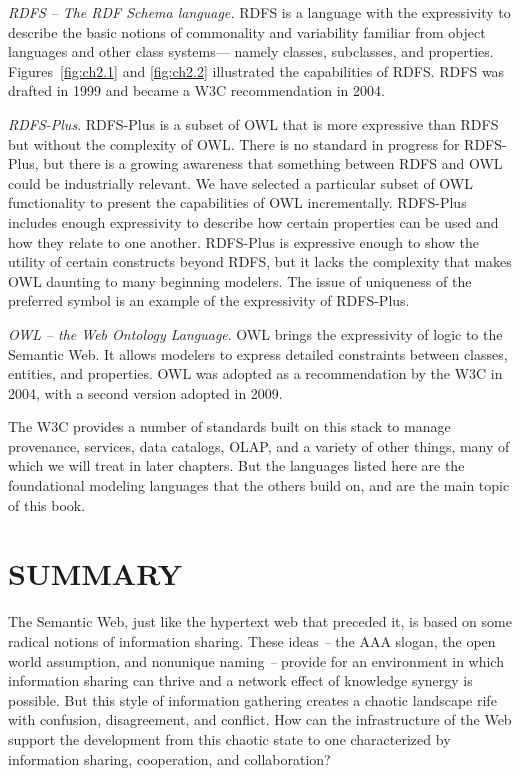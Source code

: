 \emph{RDFS} \emph{-- The RDF Schema language.} RDFS is a language with
the expressivity to describe the basic notions of commonality and
variability familiar from object languages and other class systems---
namely classes, subclasses, and properties. Figures~\ref{fig:ch2.1} and \ref{fig:ch2.2}
illustrated the capabilities of RDFS. RDFS was drafted in 1999 and
became a W3C recommendation in 2004.

\emph{RDFS-Plus}. RDFS-Plus is a subset of OWL that is more expressive
than RDFS but without the complexity of OWL. There is no standard in
progress for RDFS-Plus, but there is a growing awareness that something
between RDFS and OWL could be industrially relevant. We have selected a
particular subset of OWL functionality to present the capabilities of
OWL incrementally. RDFS-Plus includes enough expressivity to describe
how certain properties can be used and how they relate to one another.
RDFS-Plus is expressive enough to show the utility of certain constructs
beyond RDFS, but it lacks the complexity that makes OWL daunting to many
beginning modelers. The issue of uniqueness of the preferred symbol is
an example of the expressivity of RDFS-Plus.

\emph{OWL} \emph{-- the Web Ontology Language}. OWL brings the
expressivity of logic to the Semantic Web. It allows modelers to express
detailed constraints between classes, entities, and properties. OWL was
adopted as a recommendation by the W3C in 2004, with a second version
adopted in 2009.

The W3C provides a number of standards built on this stack to manage
provenance, services, data catalogs, OLAP, and a variety of other things, many 
of which we will treat in later chapters.  But the languages listed here
are the foundational modeling languages that the others build on, 
and are the main topic of this book. 

\section{SUMMARY}

The Semantic Web, just like the hypertext web that preceded it, is based
on some radical notions of information sharing. These ideas \emph{--}
the AAA slogan, the open world assumption, and nonunique naming
\emph{--} provide for an environment in which information sharing can
thrive and a network effect of knowledge synergy is possible. But this
style of information gathering creates a chaotic landscape rife with
confusion, disagreement, and conflict. How can the infrastructure of the
Web support the development from this chaotic state to one characterized
by information sharing, cooperation, and collaboration?

